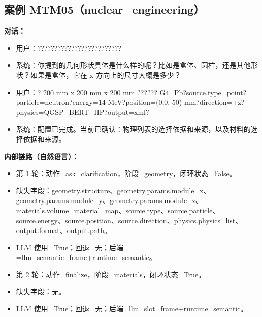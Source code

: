 \documentclass[11pt]{ctexart}
\begin{document}
\subsection{案例 MTM05（nuclear\_engineering）}
\textbf{对话：}
\begin{itemize}
\item 用户：?????????????????????????
\item 系统：你提到的几何形状具体是什么样的呢？比如是盒体、圆柱，还是其他形状？如果是盒体，它在 x 方向上的尺寸大概是多少？
\item 用户：? 200 mm x 200 mm x 200 mm ?????? G4\_Pb?source.type=point?particle=neutron?energy=14 MeV?position=(0,0,-50) mm?direction=+z?physics=QGSP\_BERT\_HP?output=xml?
\item 系统：配置已完成。当前已确认：物理列表的选择依据和来源，以及材料的选择依据和来源。
\end{itemize}
\textbf{内部链路（自然语言）：}
\begin{itemize}
\item 第 1 轮：动作=ask\_clarification，阶段=geometry，闭环状态=False。
\item 缺失字段：geometry.structure、geometry.params.module\_x、geometry.params.module\_y、geometry.params.module\_z、materials.volume\_material\_map、source.type、source.particle、source.energy、source.position、source.direction、physics.physics\_list、output.format、output.path。
\item LLM 使用=True；回退=无；后端=llm\_semantic\_frame+runtime\_semantic。
\item 第 2 轮：动作=finalize，阶段=materials，闭环状态=True。
\item 缺失字段：无。
\item LLM 使用=True；回退=无；后端=llm\_slot\_frame+runtime\_semantic。
\end{itemize}
\end{document}
